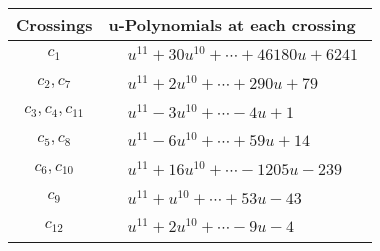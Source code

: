 \documentclass[1p]{elsarticle_modified}
\theoremstyle{definition}
\begin{document}
\begin{tabular}{m{50pt}|m{274pt}}
Crossings & \hspace{64pt}u-Polynomials at each crossing \\
\hline $$\begin{aligned}c_{1}\end{aligned}$$&$\begin{aligned}
&u^{11}+30 u^{10}+\cdots+46180 u+6241
\end{aligned}$\\
\hline $$\begin{aligned}c_{2},c_{7}\end{aligned}$$&$\begin{aligned}
&u^{11}+2 u^{10}+\cdots+290 u+79
\end{aligned}$\\
\hline $$\begin{aligned}c_{3},c_{4},c_{11}\end{aligned}$$&$\begin{aligned}
&u^{11}-3 u^{10}+\cdots-4 u+1
\end{aligned}$\\
\hline $$\begin{aligned}c_{5},c_{8}\end{aligned}$$&$\begin{aligned}
&u^{11}-6 u^{10}+\cdots+59 u+14
\end{aligned}$\\
\hline $$\begin{aligned}c_{6},c_{10}\end{aligned}$$&$\begin{aligned}
&u^{11}+16 u^{10}+\cdots-1205 u-239
\end{aligned}$\\
\hline $$\begin{aligned}c_{9}\end{aligned}$$&$\begin{aligned}
&u^{11}+u^{10}+\cdots+53 u-43
\end{aligned}$\\
\hline $$\begin{aligned}c_{12}\end{aligned}$$&$\begin{aligned}
&u^{11}+2 u^{10}+\cdots-9 u-4
\end{aligned}$\\
\hline
\end{tabular}\\~\\
\newpage\renewcommand{\arraystretch}{1}
\end{document}

